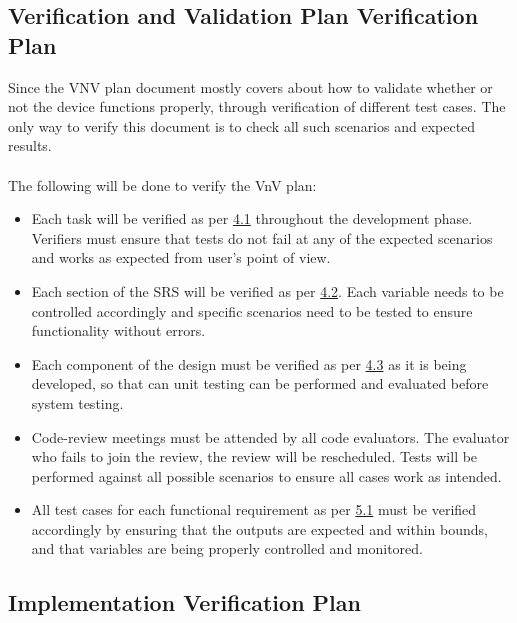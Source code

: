 \documentclass[12pt, titlepage]{article}
\begin{document}
\subsection{Verification and Validation Plan Verification Plan}

Since the VNV plan document mostly covers about how to validate whether or not the device functions properly, through verification of different test cases. The only way to verify this document is to check all such scenarios and expected results.\\
\\The following will be done to verify the VnV plan:\\
\begin{itemize}
  \item[\ding{111}] Each task will be verified as per \hyperref[4_1]{4.1} throughout the development phase. Verifiers must ensure that tests do not fail at any of the expected scenarios and works as expected from user's point of view.
  \item[\ding{111}] Each section of the SRS will be verified as per \hyperref[SRS_verification]{4.2}. Each variable needs to be controlled accordingly and specific scenarios need to be tested to ensure functionality without errors.
  \item[\ding{111}] Each component of the design must be verified as per \hyperref[sec_4_3]{4.3} as it is being developed, so that can unit testing can be performed and evaluated before system testing.
  \item[\ding{111}] Code-review meetings must be attended by all code evaluators. The evaluator who fails to join the review, the review will be rescheduled. Tests will be performed against all possible scenarios to ensure all cases work as intended.
  \item[\ding{111}] All test cases for each functional requirement as per \hyperref[sec_5_1]{5.1} must be verified accordingly by ensuring that the outputs are expected and within bounds, and that variables are being properly controlled and monitored.
\end{itemize}

\subsection{Implementation Verification Plan}
\end{document}
